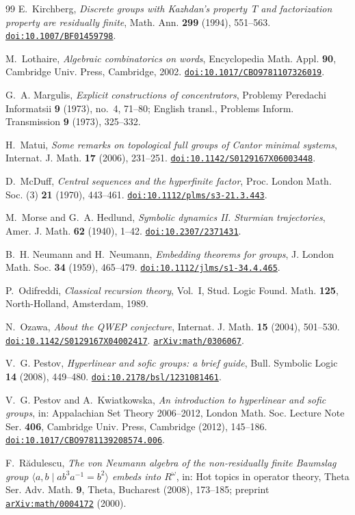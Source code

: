 \documentclass[11pt]{amsart}
\newcommand{\doi}[1]{\href{https://doi.org/#1}{\nolinkurl{doi:#1}}}
\newcommand{\arxiv}[1]{\href{https://arxiv.org/abs/#1}{\nolinkurl{arXiv:#1}}}
\begin{document}
\begin{thebibliography}{99}
E.~Kirchberg, \emph{Discrete groups with Kazhdan's property~$T$ and
factorization property are residually finite},
Math. Ann. \textbf{299} (1994), 551--563.
\doi{10.1007/BF01459798}.

M.~Lothaire, \emph{Algebraic combinatorics on words}, Encyclopedia Math.
Appl. \textbf{90}, Cambridge Univ. Press, Cambridge, 2002.
\doi{10.1017/CBO9781107326019}.

G.~A. Margulis, \emph{Explicit constructions of concentrators},
Problemy Peredachi Informatsii \textbf{9} (1973), no.~4, 71--80;
English transl., Problems Inform. Transmission \textbf{9} (1973), 325--332.

H.~Matui, \emph{Some remarks on topological full groups of Cantor
minimal systems}, Internat. J. Math. \textbf{17} (2006), 231--251.
\doi{10.1142/S0129167X06003448}.

D.~McDuff, \emph{Central sequences and the hyperfinite factor},
Proc. London Math. Soc. (3) \textbf{21} (1970), 443--461.
\doi{10.1112/plms/s3-21.3.443}.

M.~Morse and G.~A. Hedlund,
\emph{Symbolic dynamics II. Sturmian trajectories},
Amer. J. Math. \textbf{62} (1940), 1--42.
\doi{10.2307/2371431}.

B.~H. Neumann and H.~Neumann, \emph{Embedding theorems for groups},
J. London Math. Soc. \textbf{34} (1959), 465--479.
\doi{10.1112/jlms/s1-34.4.465}.


P.~Odifreddi, \emph{Classical recursion theory}, Vol.~I, Stud. Logic
Found. Math. \textbf{125}, North-Holland, Amsterdam, 1989.


N.~Ozawa, \emph{About the QWEP conjecture},
Internat. J. Math. \textbf{15} (2004), 501--530.
\doi{10.1142/S0129167X04002417}. \arxiv{math/0306067}.


V.~G. Pestov, \emph{Hyperlinear and sofic groups: a brief guide},
Bull. Symbolic Logic \textbf{14} (2008), 449--480.
\doi{10.2178/bsl/1231081461}.

V.~G. Pestov and A.~Kwiatkowska,
\emph{An introduction to hyperlinear and sofic groups},
in: Appalachian Set Theory 2006--2012, London Math. Soc. Lecture Note
Ser. \textbf{406}, Cambridge Univ. Press, Cambridge (2012), 145--186.
\doi{10.1017/CBO9781139208574.006}.

F.~R\u{a}dulescu, \emph{The von Neumann algebra of the non-residually
finite Baumslag group $\langle a,b\mid ab^3a^{-1}=b^2\rangle$ embeds into
$R^\omega$}, in: Hot topics in operator theory, Theta Ser. Adv. Math.
\textbf{9}, Theta, Bucharest (2008), 173--185; preprint
\arxiv{math/0004172} (2000).



\end{thebibliography}
\end{document}
